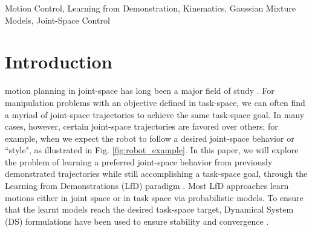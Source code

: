 \documentclass[letterpaper, 10 pt, journal, twoside, fleqn]{IEEEtran}
\begin{document}
\begin{IEEEkeywords}
Motion Control, Learning from Demonstration, Kinematics, Gaussian Mixture Models, Joint-Space Control
\end{IEEEkeywords}

\IEEEpeerreviewmaketitle
\vspace{-10pt}
\section{Introduction}
\label{sec:intro}
 motion planning in joint-space has long been a major field of study \cite{kelly2006control}. For manipulation problems with an objective defined in task-space, we can often find a myriad of joint-space trajectories to achieve the same task-space goal. In many cases, however, certain joint-space trajectories are favored over others; for example, when we expect the robot to follow a desired joint-space behavior or ``style", as illustrated in Fig. \ref{fig:robot_example}. In this paper, we will explore the problem of learning a preferred joint-space behavior from previously demonstrated trajectories while still accomplishing a task-space goal, through the Learning from Demonstrations (LfD) paradigm \cite{billard2008robot,Argall:RAS:2009}. Most LfD approaches learn motions either in joint space
\cite{Garrido:Neuro:2015,Schaal:AI:2002} or in task space
\cite{Pastor:ICRA:2009,Calinon:ISR:2015} via probabilistic models.
To ensure that the learnt models reach the desired task-space target, Dynamical System (DS) formulations have been used to ensure stability and  convergence \cite{khansari2011learning, Neumann:RAS:2015}.
\end{document}
